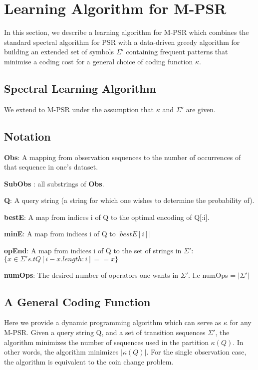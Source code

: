 \section{Learning Algorithm for M-PSR}

In this section, we describe a learning algorithm for M-PSR which combines the standard spectral algorithm for PSR \cite{bootspsr} with a data-driven greedy algorithm for building an extended set of symbols $\Sigma'$ containing frequent patterns that minimise a coding cost for a general choice of coding function $\kappa$.

\subsection{Spectral Learning Algorithm}

We extend \cite{bootspsr} to M-PSR under the assumption that $\kappa$ and $\Sigma'$ are given.


\subsection{Notation}


\textbf{Obs}: A mapping from observation sequences to the number of occurrences of that sequence in one's dataset. 

\textbf{SubObs} : all substrings of \textbf{Obs}.

\textbf{Q}: A query string (a string for which one wishes to determine the probability of).

\textbf{bestE}: A map from indices i of Q to the optimal encoding of Q[:i].

\textbf{minE}: A map from indices i of Q to $|bestE[i]|$

\textbf{opEnd}: A map from indices i of Q to the set of strings in $\Sigma'$: $\{x \in \Sigma' s.t Q[i-x.length:i] == x\}$

\textbf{numOps}: The desired number of operators one wants in $\Sigma'$. I.e numOps =  $|\Sigma'|$

\subsection{A General Coding Function}

Here we provide a dynamic programming algorithm which can serve as $\kappa$ for any M-PSR. Given a query string Q, and a set of transition sequences $\Sigma'$, the algorithm minimizes the number of sequences used in the partition $\kappa(Q)$. In other words, the algorithm minimizes $|\kappa(Q)|$. For the single observation case, the algorithm is equivalent to the coin change problem.

